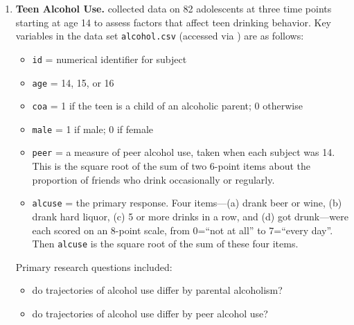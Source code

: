 \documentclass[
]{krantz}
\providecommand{\tightlist}{%
  \setlength{\itemsep}{0pt}\setlength{\parskip}{0pt}}
\begin{document}
\begin{enumerate}
\def\labelenumi{\arabic{enumi}.}
\item
  \textbf{Teen Alcohol Use.} \citet{Curran1997} collected data on 82 adolescents at three time points starting at age 14 to assess factors that affect teen drinking behavior. Key variables in the data set \texttt{alcohol.csv} (accessed via \citet{Singer2003}) are as follows:

  \begin{itemize}
  \tightlist
  \item
    \texttt{id} = numerical identifier for subject
  \item
    \texttt{age} = 14, 15, or 16
  \item
    \texttt{coa} = 1 if the teen is a child of an alcoholic parent; 0 otherwise
  \item
    \texttt{male} = 1 if male; 0 if female
  \item
    \texttt{peer} = a measure of peer alcohol use, taken when each subject was 14. This is the square root of the
    sum of two 6-point items about the proportion of friends who drink occasionally or regularly.
  \item
    \texttt{alcuse} = the primary response. Four items---(a) drank beer or wine, (b) drank hard liquor, (c) 5 or
    more drinks in a row, and (d) got drunk---were each scored on an 8-point scale, from 0=``not at all'' to
    7=``every day''. Then \texttt{alcuse} is the square root of the sum of these four items.
  \end{itemize}

  Primary research questions included:

  \begin{itemize}
  \tightlist
  \item
    do trajectories of alcohol use differ by parental alcoholism?
  \item
    do trajectories of alcohol use differ by peer alcohol use?
  \end{itemize}


\end{enumerate}
\end{document}
